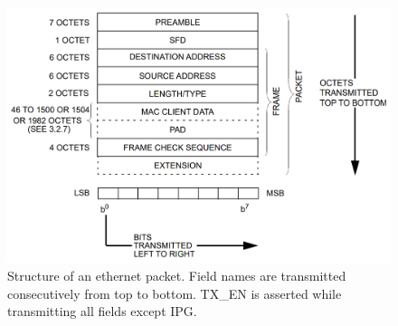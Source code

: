 \begin{figure}[h]\label{figure:mac_packet}
  \includegraphics[width=\textwidth]{assets/mac_frame.png}
  \caption[Structure of an ethernet packet]{Structure of an ethernet packet. Field names are transmitted consecutively from top to bottom. TX\_EN is asserted while transmitting all fields except IPG.}
\end{figure}

